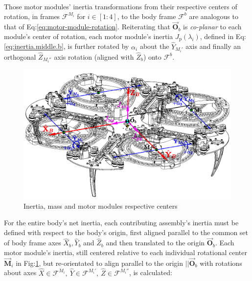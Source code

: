 \par
Those motor modules' inertia transformations from their respective centers of rotation, in frames $\mathcal{F}^{M_i}$ for $i\in[1:4]$, to the body frame $\mathcal{F}^b$ are analogous to that of Eq:\ref{eq:motor-module-rotation}. Reiterating that $\vec{\mathbf{O}}_b$ is \emph{co-planar} to each module's center of rotation, each motor module's inertia $J_\text{p}(\lambda_i)$, defined in Eq:\ref{eq:inertia.middle.b}, is further rotated by $\alpha_{i}$ about the $\hat{Y}_{M_i'}$ axis and finally an orthogonal $\hat{Z}_{M_i''}$  axis rotation (aligned with $\hat{Z}_b$) onto $\mathcal{F}^b$. 
\par
\begin{figure}[hbtp]
\vspace{-6pt}
\centering
\includegraphics[width=\textwidth]{figs/inertia-frame}
\caption{Inertia, mass and motor modules respective centers}
\label{fig:inertia-frame}
\vspace{-6pt}
\end{figure}
For the entire body's net inertia, each contributing assembly's inertia must be defined with respect to the body's origin, first aligned parallel to the common set of body frame axes $\hat{X}_b,\hat{Y}_b$ and $\hat{Z}_b$ and then translated to the origin $\vec{\mathbf{O}}_b$. Each motor module's inertia, still centered relative to each individual rotational center $\vec{\mathbf{M}}_i$ in Fig:\ref{fig:inertia-frame}, but re-orientated to align parallel to the origin $||\vec{\mathbf{O}}_b$ with rotations about axes $\hat{X}\in\mathcal{F}^{M_i},~\hat{Y}\in\mathcal{F}^{M_i'},~\hat{Z}\in\mathcal{F}^{M_i''}$, is calculated:
